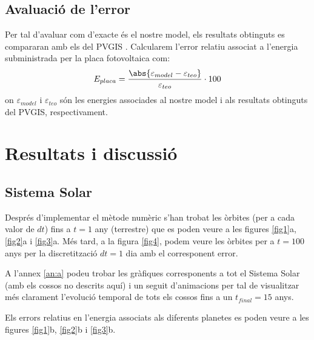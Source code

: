 \documentclass[10pt, twoside, a4paper]{article}
\begin{document}
\subsection{Avaluació de l'error}
Per tal d'avaluar com d'exacte és el nostre model, els resultats obtinguts es compararan amb els del PVGIS \cite{ref7}. Calcularem l'error relatiu associat a l'energia subministrada per la placa fotovoltaica com:
\begin{equation}
    E_{placa} = \frac{\abs{\varepsilon_{model}-\varepsilon_{teo}}}{\varepsilon_{teo}}\cdot 100
\end{equation}
on $\varepsilon_{model}$ i $\varepsilon_{teo}$ són les energies associades al nostre model i als resultats obtinguts del PVGIS, respectivament.

\section{Resultats i discussió}

\subsection{Sistema Solar}
Després d'implementar el mètode numèric s'han trobat les òrbites (per a cada valor de $dt$) fins a $t=1$ any (terrestre) que es poden veure a les figures \ref{fig1}a, \ref{fig2}a i \ref{fig3}a. Més tard, a la figura \ref{fig4}, podem veure les òrbites per a $t=100$ anys per la discretització $dt=1$ dia amb el corresponent error.
 
A l'annex \ref{an:a} podeu trobar les gràfiques corresponents a tot el Sistema Solar (amb els cossos no descrits aquí) i un seguit d'animacions per tal de visualitzar més clarament l'evolució temporal de tots els cossos fins a un $t_{final}=15$ anys.

Els errors relatius en l'energia associats als diferents planetes es poden veure a les figures \ref{fig1}b, \ref{fig2}b i \ref{fig3}b.
\end{document}
